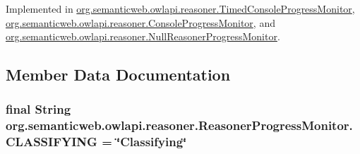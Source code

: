 Implemented in \hyperlink{classorg_1_1semanticweb_1_1owlapi_1_1reasoner_1_1_timed_console_progress_monitor_a547386d1812ab63b4e65399ddb113808}{org.\-semanticweb.\-owlapi.\-reasoner.\-Timed\-Console\-Progress\-Monitor}, \hyperlink{classorg_1_1semanticweb_1_1owlapi_1_1reasoner_1_1_console_progress_monitor_adddb7904b02b93c65be64aadc18812c0}{org.\-semanticweb.\-owlapi.\-reasoner.\-Console\-Progress\-Monitor}, and \hyperlink{classorg_1_1semanticweb_1_1owlapi_1_1reasoner_1_1_null_reasoner_progress_monitor_a9cbad0f093328cf7ab2d64e9b96d555f}{org.\-semanticweb.\-owlapi.\-reasoner.\-Null\-Reasoner\-Progress\-Monitor}.



\subsection{Member Data Documentation}
\hypertarget{interfaceorg_1_1semanticweb_1_1owlapi_1_1reasoner_1_1_reasoner_progress_monitor_adc99bfb8641b16f5e2e00309ff59985f}{
\subsubsection[{C\-L\-A\-S\-S\-I\-F\-Y\-I\-N\-G}]{\setlength{\rightskip}{0pt plus 5cm}final String org.\-semanticweb.\-owlapi.\-reasoner.\-Reasoner\-Progress\-Monitor.\-C\-L\-A\-S\-S\-I\-F\-Y\-I\-N\-G = \char`\"{}Classifying\char`\"{}\hspace{0.3cm}{\ttfamily [static]}}}\label{interfaceorg_1_1semanticweb_1_1owlapi_1_1reasoner_1_1_reasoner_progress_monitor_adc99bfb8641b16f5e2e00309ff59985f}
